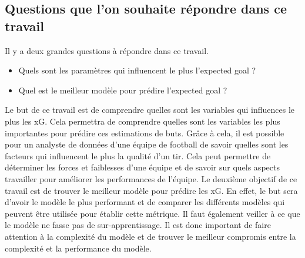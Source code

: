 \documentclass[12pt]{article}
\begin{document}
\subsection{Questions que l'on souhaite répondre dans ce travail}
Il y a deux grandes questions à répondre dans ce travail.
\begin{itemize}
    \item Quels sont les paramètres qui influencent le plus l'expected goal ?
    \item Quel est le meilleur modèle pour prédire l'expected goal ?
\end{itemize}

Le but de ce travail est de comprendre quelles sont les variables qui influences le plus les xG.
Cela permettra de comprendre quelles sont les variables les plus importantes pour prédire ces estimations de buts.
Grâce à cela, il est possible pour un analyste de données d'une équipe de football de savoir quelles sont les facteurs qui influencent le plus la qualité d'un tir.
Cela peut permettre de déterminer les forces et faiblesses d'une équipe et de savoir sur quels aspects travailler pour améliorer les performances de l'équipe.
\newline \newline
Le deuxième objectif de ce travail est de trouver le meilleur modèle pour prédire les xG.
En effet, le but sera d'avoir le modèle le plus performant et de comparer les différents modèles qui peuvent être utilisée pour établir cette métrique.
Il faut également veiller à ce que le modèle ne fasse pas de sur-apprentissage. Il est donc important de faire attention à la complexité du modèle et de trouver le meilleur compromis entre la complexité et la performance du modèle.

\newpage
\end{document}

